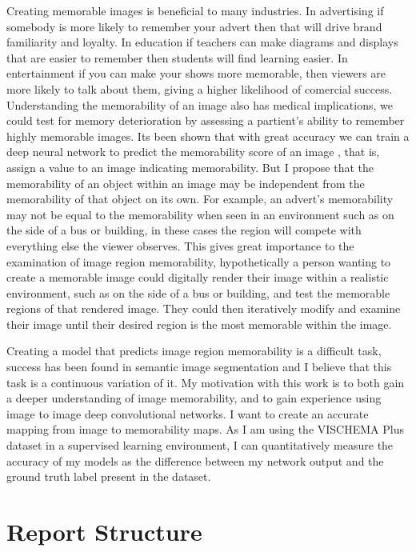 \documentclass{UoYCSproject}
\begin{document}
Creating memorable images is beneficial to many industries. In advertising if somebody is more likely to remember your advert then that will drive brand familiarity and loyalty. In education if teachers can make diagrams and displays that are easier to remember then students will find learning easier. In entertainment if you can make your shows more memorable, then viewers are more likely to talk about them, giving a higher likelihood of comercial success. Understanding the memorability of an image also has medical implications, we could test for memory deterioration by assessing a partient's ability to remember highly memorable images. Its been shown that with great accuracy we can train a deep neural network to predict the memorability score of an image \cite{Isola2011, IsolaParikhTorralbaOliva2011, ICCV15_Khosla, isola2014memorability},
that is, assign a value to an image indicating memorability. But I propose that the memorability of an object within an image may be independent from the memorability of that object on its own. For example, an advert's memorability may not be equal to the memorability when seen in an environment such as on the side of a bus or building, in these cases the region will compete with everything else the viewer observes. This gives great importance to the examination of image region memorability, hypothetically a person wanting to create a memorable image could digitally render their image within a realistic environment, such as on the side of a bus or building, and test the memorable regions of that rendered image. They could then iteratively modify and examine their image until their desired region is the most memorable within the image.


Creating a model that predicts image region memorability is a difficult task, success has been found in semantic image segmentation \cite{wang2023internimage} and I believe that this task is a continuous variation of it. My motivation with this work is to both gain a deeper understanding of image memorability, and to gain experience using image to image deep convolutional networks. I want to create an accurate mapping from image to memorability maps. As I am using the VISCHEMA Plus dataset in a supervised learning environment, I can quantitatively measure the accuracy of my models as the difference between my network output and the ground truth label present in the dataset.

\section{Report Structure}
\end{document}
